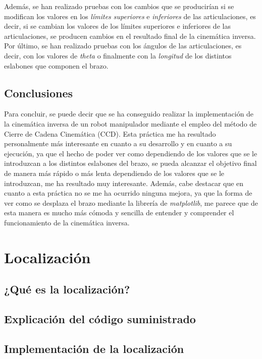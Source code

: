 \documentclass[11pt]{report}
\begin{document}
Además, se han realizado pruebas con los cambios que se producirían si se modifican los valores en los \emph{límites superiores} e \emph{inferiores} de las articulaciones, es decir, si se cambian los valores de los límites superiores e inferiores de las articulaciones, se producen cambios en el resultado final de la cinemática inversa. Por último, se han realizado pruebas con los ángulos de las articulaciones, es decir, con los valores de \emph{theta} o finalmente con la \emph{longitud} de los distintos eslabones que componen el brazo.

\section{Conclusiones}

Para concluir, se puede decir que se ha conseguido realizar la implementación de la cinemática inversa de un robot manipulador mediante el empleo del método de Cierre de Cadena Cinemática (CCD). Esta práctica me ha resultado personalmente más interesante en cuanto a su desarrollo y en cuanto a su ejecución, ya que el hecho de poder ver como dependiendo de los valores que se le introduzcan a los distintos eslabones del brazo, se pueda alcanzar el objetivo final de manera más rápido o más lenta dependiendo de los valores que se le introduzcan, me ha resultado muy interesante. Además, cabe destacar que en cuanto a esta práctica no se me ha ocurrido ninguna mejora, ya que la forma de ver como se desplaza el brazo mediante la librería de \emph{matplotlib}, me parece que de esta manera es mucho más cómoda y sencilla de entender y comprender el funcionamiento de la cinemática inversa.

\chapter{Localización}

\section{¿Qué es la localización?}

\section{Explicación del código suministrado}

\section{Implementación de la localización}
\end{document}
